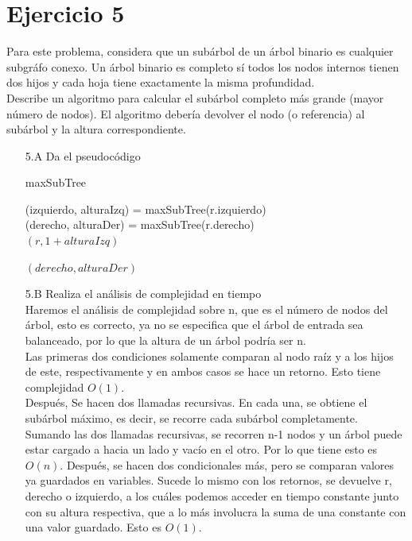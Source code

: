 \documentclass[12pt]{article}
\begin{document}
\section*{Ejercicio 5}
Para este problema, considera que un subárbol de un árbol binario es cualquier subgráfo conexo. Un árbol binario es completo sí todos los nodos internos tienen dos hijos y cada hoja tiene exactamente la misma profundidad.\\
Describe un algoritmo para calcular el subárbol completo más grande (mayor número de nodos). El algoritmo debería devolver el nodo (o referencia) al subárbol y la altura correspondiente.
\begin{itemize}
    \item[5.A] Da el pseudocódigo\\
    \begin{algorithm}[H]
        \caption{maxSubTree}



        (izquierdo, alturaIzq) = maxSubTree(r.izquierdo)\\
        (derecho, alturaDer) = maxSubTree(r.derecho)\\

        {\Return $(r, 1 + alturaIzq)$}

        \Return $(derecho, alturaDer)$
    \end{algorithm}
    \item[5.B] Realiza el análisis de complejidad en tiempo\\
    Haremos el análisis de complejidad sobre n, que es el número de nodos del árbol, esto es correcto, ya no se especifica que el árbol de entrada
    sea balanceado, por lo que la altura de un árbol podría ser n.\\
    Las primeras dos condiciones solamente comparan al nodo raíz y a los hijos de este, respectivamente
    y en ambos casos se hace un retorno. Esto tiene complejidad $O(1)$.\\
    Después, Se hacen dos llamadas recursivas. En cada una, se obtiene el subárbol máximo, es decir, se recorre cada subárbol completamente.\\
    Sumando las dos llamadas recursivas, se recorren n-1 nodos y un árbol puede estar cargado a hacia un lado y vacío en el otro. Por lo que
    tiene esto es $O(n)$.
    Después, se hacen dos condicionales más, pero se comparan valores ya guardados en variables.
    Sucede lo mismo con los retornos, se devuelve r, derecho o izquierdo, a los cuáles podemos acceder en tiempo constante junto con su altura respectiva, que a lo más involucra la suma de una constante con una valor guardado. Esto es $O(1)$.\\


\end{itemize}
\end{document}
